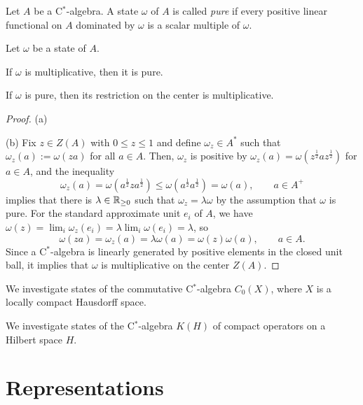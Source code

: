 \documentclass{../../large}
\begin{document}
\begin{prb}
Let $A$ be a C$^*$-algebra.
A state $\omega$ of $A$ is called \emph{pure} if every positive linear functional on $A$ dominated by $\omega$ is a scalar multiple of $\omega$.

Let $\omega$ be a state of $A$.
\begin{parts}
\item If $\omega$ is multiplicative, then it is pure.
\item If $\omega$ is pure, then its restriction on the center is multiplicative.
\end{parts}
\end{prb}
\begin{proof}
(a)

(b)
Fix $z\in Z(A)$ with $0\le z\le1$ and define $\omega_z\in A^*$ such that $\omega_z(a):=\omega(za)$ for all $a\in A$.
Then, $\omega_z$ is positive by $\omega_z(a)=\omega(z^{\frac12}az^{\frac12})$ for $a\in A$, and the inequality
\[\omega_z(a)=\omega(a^{\frac12}za^{\frac12})\le\omega(a^{\frac12}a^{\frac12})=\omega(a),\qquad a\in A^+\]
implies that there is $\lambda\in\mathbb{R}_{\ge0}$ such that $\omega_z=\lambda\omega$ by the assumption that $\omega$ is pure.
For the standard approximate unit $e_i$ of $A$, we have $\omega(z)=\lim_i\omega_z(e_i)=\lambda\lim_i\omega(e_i)=\lambda$, so
\[\omega(za)=\omega_z(a)=\lambda\omega(a)=\omega(z)\omega(a),\qquad a\in A.\]
Since a C$^*$-algebra is linearly generated by positive elements in the closed unit ball, it implies that $\omega$ is multiplicative on the center $Z(A)$.
\end{proof}


\begin{prb}
We investigate states of the commutative C$^*$-algebra $C_0(X)$, where $X$ is a locally compact Hausdorff space.
\end{prb}

\begin{prb}
We investigate states of the C$^*$-algebra $K(H)$ of compact operators on a Hilbert space $H$.
\end{prb}

\section{Representations}
\end{document}
